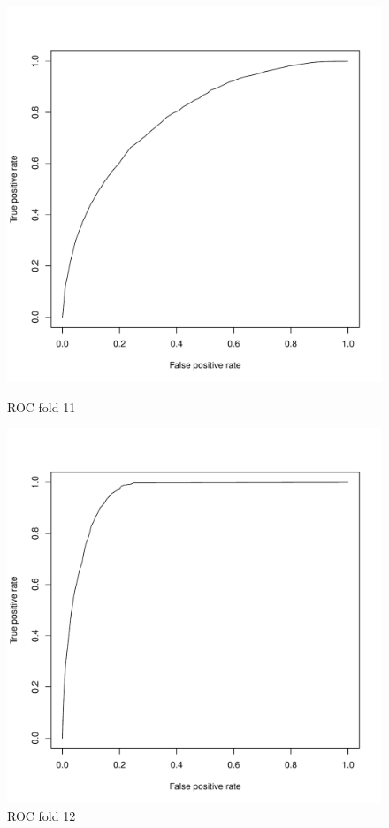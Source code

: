 \documentclass{article}\usepackage[]{graphicx}\usepackage[]{color}
\begin{document}
\begin{figure}[h]
  \includegraphics[width=\linewidth]{ROC_block11.pdf}
  \caption{ROC fold 11}\label{}
\endminipage\hfill
{}%
  \includegraphics[width=\linewidth]{ROC_block12.pdf}
  \caption{ROC fold 12}\label{}
\endminipage
\end{figure}
\end{document}
